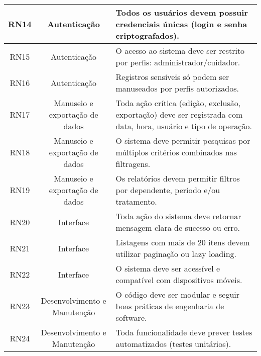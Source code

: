 \begin{quadro}
\begin{tabular}{|c|c|p{10cm}|}
        RN14   & Autenticação                  & Todos os usuários devem possuir credenciais únicas (login e senha criptografados). \\ \hline
        RN15   & Autenticação                  & O acesso ao sistema deve ser restrito por perfis: administrador/cuidador. \\ \hline
        RN16   & Autenticação                  & Registros sensíveis só podem ser manuseados por perfis autorizados. \\ \hline
        RN17   & Manuseio e exportação de dados & Toda ação crítica (edição, exclusão, exportação) deve ser registrada com data, hora, usuário e tipo de operação. \\ \hline
        RN18   & Manuseio e exportação de dados & O sistema deve permitir pesquisas por múltiplos critérios combinados nas filtragens. \\ \hline
        RN19   & Manuseio e exportação de dados & Os relatórios devem permitir filtros por dependente, período e/ou tratamento. \\ \hline
        RN20   & Interface                    & Toda ação do sistema deve retornar mensagem clara de sucesso ou erro. \\ \hline
        RN21   & Interface                    & Listagens com mais de 20 itens devem utilizar paginação ou lazy loading. \\ \hline
        RN22   & Interface                    & O sistema deve ser acessível e compatível com dispositivos móveis. \\ \hline
        RN23   & Desenvolvimento e Manutenção & O código deve ser modular e seguir boas práticas de engenharia de software. \\ \hline
        RN24   & Desenvolvimento e Manutenção & Toda funcionalidade deve prever testes automatizados (testes unitários). \\ \hline
    \end{tabular}
\end{quadro}